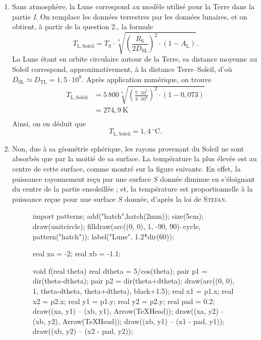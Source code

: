\documentclass[a4paper, 11pt]{article}
\begin{document}
\begin{multicols}{2}
		\begin{enumerate}[start=8]
			\item Sans atmosphère, la Lune correspond au modèle utilisé pour la Terre dans la partie \textit{I}. On remplace les données terrestres par les données lunaires, et on obtient, à partir de la question 2.,  la formule \[
					\boxed{T_\mathrm{L,Soleil} = T_\mathrm{S} \cdot \sqrt[4]{\left( \frac{R_\mathrm{S}}{2D_\mathrm{SL}} \right)^{\!\!2} \cdot (1-A_\mathrm{L})}.}
				\] La Lune étant en orbite circulaire autour de la Terre, sa distance moyenne au Soleil correspond, approximativement, à la distance Terre--Soleil, d'où $D_\mathrm{SL} \simeq D_\mathrm{TL} = 1{,}5 \cdot 10^8$.
				Après application numérique, on trouve
				\begin{align*}
					T_\mathrm{L,Soleil} &= 5\,800 \sqrt[4]{\left( \frac{7\cdot 10^5}{3 \cdot 10^8} \right)^{\!\!2} \cdot (1-0{,}073) } \\
					&= 274{,}9\:\mathrm{K}\\
				\end{align*}
				Ainsi, on en déduit que \[
					\boxed{T_\mathrm{L,Soleil} = 1{,}4\:^\circ\mathrm{C}.}
				\] 
			\item Non, due à sa géométrie sphérique, les rayons provenant du Soleil ne sont absorbés que par la moitié de sa surface. La température la plus élevée est au centre de cette surface, comme montré sur la figure suivante.
				En effet, la puissance rayonnement reçu par une surface $S$\/ donnée diminue en s'éloignant du centre de la partie ensoleillée ; et, la température est proportionnelle à la puissance reçue pour une surface $S$\/ donnée, d'après la loi de \textsc{Stefan}.
				\begin{figure}[H]
					\centering
					\begin{asy}
						import patterns;
						add("hatch",hatch(2mm));
						size(5cm);
						draw(unitcircle);
						filldraw(arc((0, 0), 1, -90, 90)--cycle, pattern("hatch"));
						label("Lune", 1.2*dir(60));

						real xa = -2;
						real xb = -1.1;
						
						void f(real theta) {
							real dtheta = 5/cos(theta);
							pair p1 = dir(theta-dtheta);
							pair p2 = dir(theta+dtheta);
							draw(arc((0, 0), 1, theta-dtheta, theta+dtheta), black+1.5);
							real x1 = p1.x; real x2 = p2.x;
							real y1 = p1.y; real y2 = p2.y; real pad = 0.2;
							draw((xa, y1) -- (xb, y1), Arrow(TeXHead));
							draw((xa, y2) -- (xb, y2), Arrow(TeXHead));
							draw((xb, y1) -- (x1 - pad, y1));
							draw((xb, y2) -- (x2 - pad, y2));
						}


\end{asy}
\end{figure}
\end{enumerate}
\end{multicols}
\end{document}
